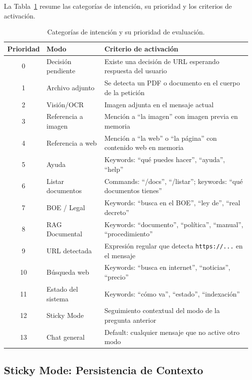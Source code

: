 La Tabla~\ref{tab:intenciones-detalle} resume las categorías de intención, su prioridad y los criterios de activación.

\begin{table}[H]
\centering
\caption{Categorías de intención y su prioridad de evaluación.}
\label{tab:intenciones-detalle}
\begin{tabular}{clp{7cm}}
\toprule
\textbf{Prioridad} & \textbf{Modo} & \textbf{Criterio de activación} \\
\midrule
0 & Decisión pendiente   & Existe una decisión de URL esperando respuesta del usuario \\
1 & Archivo adjunto      & Se detecta un PDF o documento en el cuerpo de la petición \\
2 & Visión/OCR           & Imagen adjunta en el mensaje actual \\
3 & Referencia a imagen  & Mención a ``la imagen'' con imagen previa en memoria \\
4 & Referencia a web     & Mención a ``la web'' o ``la página'' con contenido web en memoria \\
5 & Ayuda                & Keywords: ``qué puedes hacer'', ``ayuda'', ``help'' \\
6 & Listar documentos    & Commands: ``/docs'', ``/listar''; keywords: ``qué documentos tienes'' \\
7 & BOE / Legal          & Keywords: ``busca en el BOE'', ``ley de'', ``real decreto'' \\
8 & RAG Documental       & Keywords: ``documento'', ``política'', ``manual'', ``procedimiento'' \\
9 & URL detectada        & Expresión regular que detecta \texttt{https://...} en el mensaje \\
10 & Búsqueda web        & Keywords: ``busca en internet'', ``noticias'', ``precio'' \\
11 & Estado del sistema  & Keywords: ``cómo va'', ``estado'', ``indexación'' \\
12 & Sticky Mode         & Seguimiento contextual del modo de la pregunta anterior \\
13 & Chat general        & Default: cualquier mensaje que no active otro modo \\
\bottomrule
\end{tabular}
\end{table}

\subsection{Sticky Mode: Persistencia de Contexto}

